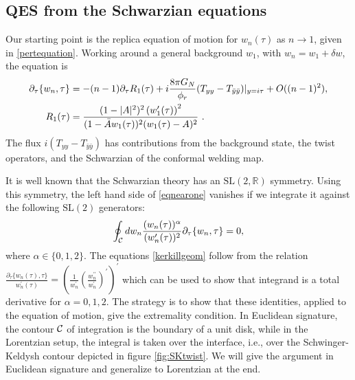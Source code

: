 \documentclass[12pt]{article}
\newcommand{\p}{\partial}
\newcommand{\f}{\frac}
\let\l=\lambda \let\m=\mu \let\n=\nu \let\x=\xi \let\p=\phi \let\r=v
\let\f=\frac
\let\pa=\partial
\def\ba{\begin{eqnarray}}
\def\ea{\end{eqnarray}}
\renewcommand{\p}{\partial}
\numberwithin{equation}{section}
\def\m{{\mu}}
\def\n{{\nu}}
\def\p{{\phi}}
\def\ba{\begin{eqnarray}}
\def\ea{\end{eqnarray}}
\def\r{\rightarrow}
\def\f {\frac}
\def\l{\left}
\def\r{\right}
\def \bA {\bar{A}}
\def\x{\bar{x}}
\renewcommand{\p}{\partial}
\newcommand{\by}{\bar{y}}
\begin{document}
\begin{spacing}{1.1}
\subsection{QES from the Schwarzian equations} \label{sec:QESSch}
Our starting point is the replica equation of motion for $w_n(\tau)$ as $n \to 1$, given in \eqref{pertequation}. Working around a general background $w_1$, with $w_n = w_1 + \delta w$, the equation is 
\begin{align}\label{eqnearone}
 \p_\tau \{w_n, \tau \} & = - (n-1) \p_\tau R_1(\tau) +i  \f{8\pi G_N}{\phi_r}  (  T_{yy} -  T_{\by \by} ) |_{y = i \tau}  + O((n-1)^2),\\
R_1 (\tau) &=\frac{(1-|A|^2)^2 \l(w_1'(\tau)\r)^2}{(1- \bA w_1(\tau))^2(w_1(\tau)-A)^2} \ . \notag
\end{align}
The flux $i (  T_{yy} -  T_{\by \by} )$ has contributions from the background state, the twist operators, and the Schwarzian of the conformal welding map.


 
 It is well known that the Schwarzian theory has an $\text{SL}(2, \mathbb{R})$ symmetry. Using this symmetry, the left hand side of \eqref{eqnearone} vanishes if we integrate it against the following $\text{SL}(2)$ generators:
\ba\label{kerkillgeom}
\oint_{\cal C} dw_n \frac{(w_n(\tau))^\alpha}{(w_n'(\tau))^2} \pa_{\tau}\{ w_n ,\tau \}=0,
\ea 
where $\alpha \in \{0,1,2\}$. The equations \eqref{kerkillgeom} follow from the relation $ \f{ \pa_\tau\{ w_n(\tau), \tau \}}{w_n^\prime (\tau)}= \l( \f{1}{w_n^\prime} \l( \f{w_n^{\prime \prime}}{w_n^\prime} \r)^\prime \r)^\prime$ which can be used to show that integrand is a total derivative for $\alpha = 0,1,2$.
The strategy is to show that these identities, applied to the equation of motion, give the extremality condition. In Euclidean signature, the contour ${\cal C}$ of integration is the boundary of a unit disk, while in the Lorentzian setup, the integral is taken over the interface, i.e., over the Schwinger-Keldysh contour depicted in figure \ref{fig:SKtwist}. We will give the argument in Euclidean signature and generalize to Lorentzian at the end. 


\end{spacing}
\end{document}

